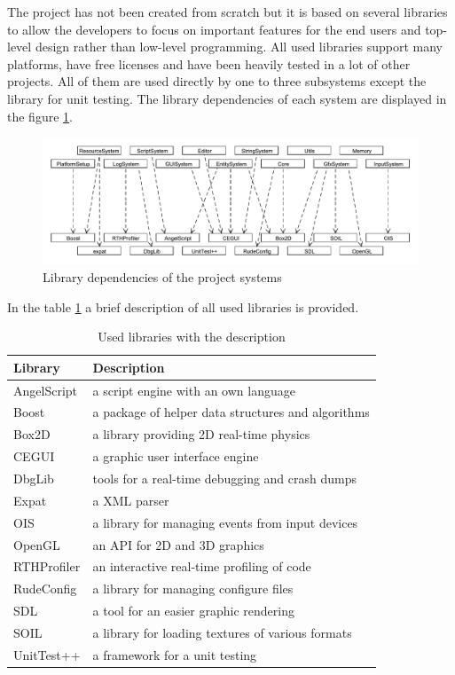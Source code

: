 \documentclass[a4paper, 12pt]{report}
\begin{document}
The project has not been created from scratch but it is based on several libraries to allow the developers to focus on important features for the end users and top-level design rather than low-level programming. All used libraries support many platforms, have free licenses and have been heavily tested in a lot of other projects. All of them are used directly by one to three subsystems except the library for unit testing. The library dependencies of each system are displayed in the figure \ref{fig:library-dependence}.

\begin{figure}[htbp]
	\centering
		\includegraphics[width=1\textwidth]{LibraryDependence.pdf}
	\caption{Library dependencies of the project systems}
	\label{fig:library-dependence}
\end{figure}

In the table \ref{tab:library-list} a brief description of all used libraries is provided.

\begin{table}[htbp]
	\centering
		\begin{tabular}{|p{0.23\hsize}|p{0.70\hsize}|}
			\hline
			Library & Description\\
			\hline
			AngelScript\cite{angelscript} & a script engine with an own language\\
			Boost\cite{boost} & a package of helper data structures and algorithms\\
			Box2D\cite{box2d} & a library providing 2D real-time physics\\
			CEGUI\cite{cegui} & a graphic user interface engine\\
			DbgLib\cite{dbglib} & tools for a real-time debugging and crash dumps\\
			Expat\cite{expat} & a XML parser\\
			OIS\cite{ois} & a library for managing events from input devices\\
			OpenGL\cite{opengl} & an API for 2D and 3D graphics\\
			RTHProfiler\cite{rthprofiler} & an interactive real-time profiling of code\\
			RudeConfig\cite{rudeconfig} & a library for managing configure files\\
			SDL\cite{sdl} & a tool for an easier graphic rendering\\
			SOIL\cite{soil} & a library for loading textures of various formats\\
			UnitTest++\cite{unittest} & a framework for a unit testing\\
			\hline
		\end{tabular}
	\caption[Used libraries with the description]{Used libraries with the description}
	\label{tab:library-list}
\end{table}
\end{document}
